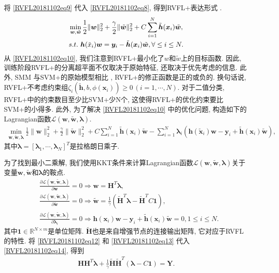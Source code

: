 将 \eqref{RVFL20181102eq9} 代入 \eqref{RVFL20181102eq8}, 得到RVFL+表达形式 \cite{Saunders1998}.
\begin{align}
    &\min\limits_{{\bm w},\tilde {\bm w}} \frac 1 2\|{\bm w}\|_2^ 2 + \frac \gamma 2 \|\tilde {\bm w}\|_2^ 2 + C\sum_{i=1}^N  {\tilde {\bm h}}({\bm x}_i)\tilde {\bm w},\notag\\
    &s.t.\,\,\bm h(\tilde x_i){\bm w} =\bm y_i - {\tilde {\bm h}}({\bm x}_i)\tilde {\bm w}, \forall \leq i \leq  N.
    \label{RVFL20181102eq10}
\end{align}
从 \eqref{RVFL20181102eq10}, 我们注意到RVFL+最小化了$w$和$\tilde w$上的目标函数. 因此, 训练阶段RVFL+的分离超平面不仅取决于原始特征, 还取决于优先考虑的信息.
此外, SMM \cite{Cortes1995Support} 与SVM+的原始模型相比 \cite{VAPNIK2009544}, RVFL+的修正函数是正的或负的.
换句话说, RVFL+不考虑约束组$\zeta_i(\tilde{\bm h}, b, \phi({\bm x}_i))\geq 0\,(i=1, \cdots, N)$.
对于二值分类, RVFL+中的约束数目至少比SVM+少N个, 这使得RVFL+的优化约束要比SVM+的小得多.
此外, 为了解决 \eqref{RVFL20181102eq10} 中的优化问题, 构造如下的Lagrangian函数$\mathscr L(\bm w, \tilde{\bm w}, \bm\lambda)$.
\begin{align}
    \min\limits_{\bm w, \tilde{\bm w},\bm \lambda} \frac 1 2\|{\bm w}\|_2^ 2 + \frac \gamma 2 \|\tilde {\bm w}\|_2^ 2 + C\sum_{i=1}^N  {\tilde {\bm h}}({\bm x}_i)\tilde {\bm w}-\sum_{i=1}^N  \bm \lambda_i(\bm h(\tilde {\bm x}_i){\bm w} -\bm y_i +{\tilde {\bm h}}({\bm x}_i)\tilde {\bm w}),
\end{align}
其中$\bm\lambda=[\bm\lambda_1, \cdots, \bm\lambda_N]^T$是拉格朗日乘子.

为了找到最小二乘解, 我们使用KKT条件来计算Lagrangian函数$\mathscr L(\bm w, \tilde{\bm w},\bm\lambda)$关于变量$\bm w,\tilde{\bm w}$和$\bm\lambda$的鞍点.
\begin{align}
 &\frac {\partial \mathscr L (\bm w, \tilde{\bm w},\bm \lambda)}{\partial \bm w}= 0 \Rightarrow  \bm w = \bm  H^T \bm \lambda, \label{RVFL20181102eq12}\\
 &\frac {\partial \mathscr L (\bm w, \tilde{\bm w},\bm \lambda)}{\partial \tilde{\bm w}} = 0 \Rightarrow  \tilde{\bm w} = \frac 1  \gamma  (\tilde{\bm  H}^T  \bm \lambda - \tilde{\bm  H}^T C \bm 1), \label{RVFL20181102eq13}\\
 &\frac {\partial \mathscr L (\bm w, \tilde{\bm w},\bm \lambda)}{\partial \bm \lambda_i} = 0 \Rightarrow  \bm h(\bm x_i)\bm w - \bm y_i + \tilde {\bm h}({\bm x}_i) \tilde{\bm w} = 0, 1 \leq  i \leq  N.\label{RVFL20181102eq14}
\end{align}
其中$\bm 1\in\mathbb R^{N\times m}$是单位矩阵. $\tilde{\bm H}$也是来自增强节点的连接输出矩阵, 它对应于RVFL的特性.
将 \eqref{RVFL20181102eq12} 和 \eqref{RVFL20181102eq13} 代入 \eqref{RVFL20181102eq14}, 得到
\begin{align}
    \bm H \bm H^T  \bm \lambda + \frac 1 \gamma\tilde{\bm H} \tilde{\bm H}^T  (\bm \lambda -C \bm 1) = \bm Y. \label{RVFL20181102eq15}
\end{align}

